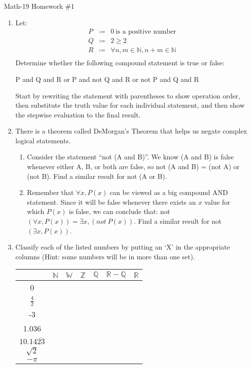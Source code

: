 \documentclass[letterpaper,12pt,fleqn]{article}
\begin{document}
\begin{center}
\Large Math-19 Homework \#1
\end{center}

\vspace{0.5in}

\begin{enumerate}
\item Let:
\begin{eqnarray*}
P &\coloneqq& 0\ \mbox{is a positive number} \\
Q &\coloneqq& 2\ge2 \\
R &\coloneqq& \forall n,m\in\mathbb{N}, n+m\in\mathbb{N} \\
\end{eqnarray*}
Determine whether the following compound statement is true or false:

\hspace{0.5in}P and Q and R or P and not Q and R or not P and Q and R

Start by rewriting the statement with parentheses to show operation order,
then substitute the truth value for each individual statement, and then
show the stepwise evaluation to the final result.

\item There is a theorem called DeMorgan's Theorem that helps us negate
complex logical statements.
\begin{enumerate}
\item Consider the statement ``not (A and B)''. We know (A and B) is false
whenever either A, B, or both are false, so not (A and B) = (not A) or (not B).
Find a similar result for not (A or B).

\item Remember that $\forall x,P(x)$ can be viewed as a big compound AND
statement. Since it will be false whenever there exists an $x$ value for which
$P(x)$ is false, we can conclude that: not $(\forall x,P(x)) = \exists x,
(not\ P(x))$.  Find a similar result for not $(\exists x,P(x))$.
\end{enumerate}

\item Classify each of the listed numbers by putting an `X' in the appropriate
columns (Hint: some numbers will be in more than one set).

\begin{tabular}{|c|c|c|c|c|c|c|}
\hline
 & $\mathbb{N}$ & $\mathbb{W}$ & $\mathbb{Z}$ & $\mathbb{Q}$ &
    $\mathbb{R}-\mathbb{Q}$ & $\mathbb{R}$ \\
\hline
0 & & & & & & \\
\hline
$\frac{4}{2}$ & & & & & & \\
\hline
-3 & & & & & & \\
\hline
1.036 & & & & & & \\
\hline
$10.14\overline{23}$ & & & & & & \\
\hline
$\sqrt{2}$ & & & & & & \\
\hline
$-\pi$ & & & & & & \\
\hline
\end{tabular}


\end{enumerate}
\end{document}
